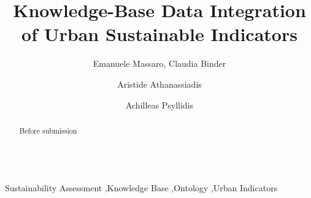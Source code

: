 \documentclass[preprint,12pt]{elsarticle}
\begin{document}
\begin{frontmatter}


\title{Knowledge-Base Data Integration of Urban Sustainable Indicators}




\author{Emanuele Massaro, Claudia Binder}
\address{HERUS Lab, EPFL, Switzerland}
\author{Aristide Athanassiadis}
\address{Circular Economy and Urban Metabolism, Université Libre de Bruxelles, Belgium, Belgium}
\author{Achilleas Psyllidis}
\address{Web Information Systems, Delft University, Netherlands}

\begin{abstract}
Before submission
\end{abstract}

\begin{keyword}
\\ Sustainability Assessment \sep Knowledge Base \sep Ontology \sep Urban Indicators


\end{keyword}

\end{frontmatter}

\linenumbers

\end{document}
